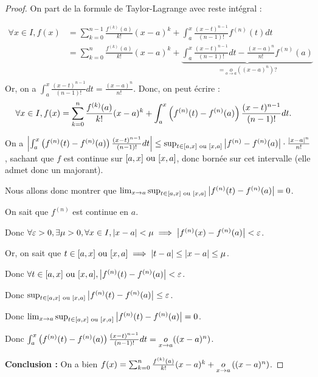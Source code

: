 \documentclass[12pt, a4paper]{report}
\begin{document}
\begin{proof}
    On part de la formule de Taylor-Lagrange avec reste intégral :

    \begin{align*}
        \forall x \in I, f(x) &= \sum_{k=0}^{n-1} \frac{f^{(k)}(a)}{k!}(x-a)^k + \int_a^x \frac{(x-t)^{n-1}}{(n-1)!} f^{(n)}(t) dt\\
        &= \sum_{k=0}^n \frac{f^{(k)}(a)}{k!}(x-a)^k + \underbrace{\int_a^x \frac{(x-t)^{n-1}}{(n-1)!}dt - \frac{(x-a)^n}{n!} f^{(n)}(a)}_{=\underset{o\to a}{o}((x-a)^n)?}\\
    \end{align*}
    Or, on a $\int_a^x \frac{(x-t)^{n-1}}{(n-1)!} dt = \frac{(x-a)^n}{n!}$. Donc, on peut écrire :
    \begin{align*}
        \forall x \in I, f(x) &= \sum_{k=0}^n \frac{f^{(k)}(a)}{k!}(x-a)^k + \int_a^x \left(f^{(n)}(t)-f^{(n)}(a)\right)\frac{(x-t)^{n-1}}{(n-1)!} dt.
    \end{align*}

    On a $\left|\int_a^x \left(f^{(n)}(t)-f^{(n)}(a)\right)\frac{(x-t)^{n-1}}{(n-1)!} dt\right| \le \sup_{t\in[a,x]\text{ ou }[x,a]} \left|f^{(n)}-f^{(n)}(a)\right| \cdot \frac{\left|x-a\right|^n}{n!}$, sachant que $f$ est continue sur $[a,x] \text{ ou } [x,a]$, donc bornée sur cet intervalle (elle admet donc un majorant).

    Nous allons donc montrer que $\lim_{x\to a} \sup_{t\in[a,x]\text{ ou }[x,a]} \left|f^{(n)}(t)-f^{(n)}(a)\right| = 0$.

    On sait que $f^{(n)}$ est continue en $a$.

    Donc $\forall \varepsilon > 0, \exists \mu > 0, \forall x \in I, \left|x-a\right| < \mu \implies \left|f^{(n)}(x)-f^{(n)}(a)\right| < \varepsilon$.

    Or, on sait que $t \in [a,x] \text{ ou } [x,a] \implies \left|t-a\right| \le \left|x-a\right| \le \mu$.

    Donc $\forall t \in [a,x] \text{ ou } [x,a], \left|f^{(n)}(t)-f^{(n)}(a)\right| < \varepsilon$.

    Donc $\sup_{t\in[a,x]\text{ ou }[x,a]} \left|f^{(n)}(t)-f^{(n)}(a)\right| \le \varepsilon$.

    Donc $\lim_{x\to a} \sup_{t\in[a,x]\text{ ou }[x,a]} \left|f^{(n)}(t)-f^{(n)}(a)\right| = 0$.

    Donc $\int_a^x \left(f^{(n)}(t)-f^{(n)}(a)\right)\frac{(x-t)^{n-1}}{(n-1)!} dt = \underset{x\to a}{o}((x-a)^n)$.

    \textbf{Conclusion :} On a bien $f(x) = \sum_{k=0}^{n} \frac{f^{(k)}(a)}{k!}(x-a)^k + \underset{x\to a}{o}\left((x-a)^n\right)$.
\end{proof}
\end{document}
